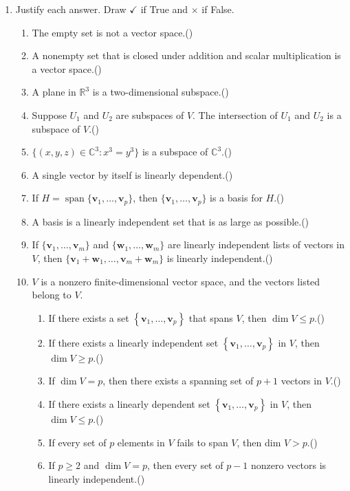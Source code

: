 \documentclass[a4paper,11pt]{article}
\begin{document}
\begin{enumerate}
  \item Justify each answer. Draw $\checkmark$ if True and $\times$ if False.
  \begin{enumerate}
    \item The empty set is not a vector space.\hfill (\quad)
    \item A nonempty set that is closed under addition and scalar multiplication is a vector space.\hfill (\quad)
    \item A plane in $\mathbb{R}^3$ is a two-dimensional subspace.\hfill (\quad)
    \item Suppose $U_1$ and $U_2$ are subspaces of $V$. The intersection of $U_1$ and $U_2$ is a subspace of $V$.\hfill (\quad)
    \item $\{(x,y,z)\in\mathbb{C}^3: x^3=y^3\}$ is a subspace of $\mathbb{C}^3$.\hfill (\quad)
    \item A single vector by itself is linearly dependent.\hfill (\quad)
    \item If $H = \operatorname{span} \{\mathbf{v}_1,\dots,\mathbf{v}_p\}$, then $\{\mathbf{v}_1,\dots,\mathbf{v}_p\}$ is a basis for $H$.\hfill (\quad)
    \item A basis is a linearly independent set that is as large as possible.\hfill (\quad)
    \item  If $\{\mathbf{v}_1,\dots,\mathbf{v}_m\}$ and $\{\mathbf{w}_1,\dots,\mathbf{w}_m\}$ are linearly independent lists of vectors in $V$, then  $\{\mathbf{v}_1+\mathbf{w}_1,\dots,\mathbf{v}_m+\mathbf{w}_m\}$ is linearly independent.\hfill (\quad)
    \item $V$ is a nonzero finite-dimensional vector space, and the vectors listed belong to $V$. \begin{enumerate}
    \item
          If there exists a set $\left\{\mathbf{v}_{1}, \ldots, \mathbf{v}_{p}\right\}$ that spans $V$, then $\operatorname{dim} V \leq p $.\hfill (\quad)
    \item
          If there exists a linearly independent set $\left\{\mathbf{v}_{1}, \ldots, \mathbf{v}_{p}\right\}$ in $V$, then $\operatorname{dim} V \geq p$.\hfill (\quad)
    \item
          If $\operatorname{dim} V=p$, then there exists a spanning set of $p+1$ vectors in $V$.\hfill (\quad)
    \item
          If there exists a linearly dependent set $\left\{\mathbf{v}_{1}, \ldots, \mathbf{v}_{p}\right\}$ in $V$, then $\operatorname{dim} V \leq p$.\hfill (\quad)
    \item
          If every set of $p$ elements in $V$ fails to span $V$, then dim $V>p$.\hfill (\quad)
    \item
          If $p \geq 2$ and $\operatorname{dim} V=p$, then every set of $p-1$ nonzero vectors is linearly independent.\hfill (\quad)


\end{enumerate}
\end{enumerate}
\end{enumerate}
\end{document}
